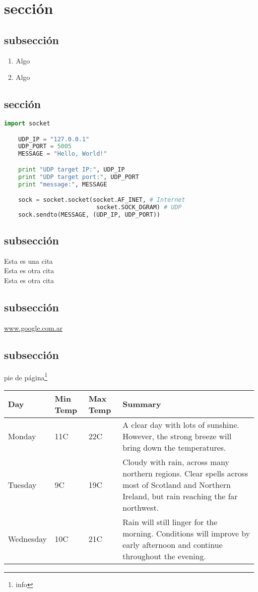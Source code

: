\section{secci\'on}
\subsection{subsecci\'on}
  \begin{enumerate}
    \item Algo
    \item Algo
  \end{enumerate}
\subsection{secci\'on}
  \begin{lstlisting}[language=Python]
    import socket

    UDP_IP = "127.0.0.1"
    UDP_PORT = 5005
    MESSAGE = "Hello, World!"

    print "UDP target IP:", UDP_IP
    print "UDP target port:", UDP_PORT
    print "message:", MESSAGE

    sock = socket.socket(socket.AF_INET, # Internet
                          socket.SOCK_DGRAM) # UDP
    sock.sendto(MESSAGE, (UDP_IP, UDP_PORT))
  \end{lstlisting}
\subsection{subsecci\'on}
  \noindent
  Esta es una cita \cite{einstein}\\
  Esta es otra cita \cite{dirac}\\
  Esta es otra cita \cite{knuthwebsite}\\
\subsection{subsecci\'on}
  \noindent
  \url{www.google.com.ar}
\subsection{subsecci\'on}
pie de p\'agina\footnote{info}
\begin{center}
    \begin{tabular}{ | l | l | l | p{5cm} |}
    \hline
    Day & Min Temp & Max Temp & Summary \\ \hline
    Monday & 11C & 22C & A clear day with lots of sunshine.
    However, the strong breeze will bring down the temperatures. \\ \hline
    Tuesday & 9C & 19C & Cloudy with rain, across many northern regions. Clear spells
    across most of Scotland and Northern Ireland,
    but rain reaching the far northwest. \\ \hline
    Wednesday & 10C & 21C & Rain will still linger for the morning.
    Conditions will improve by early afternoon and continue
    throughout the evening. \\
    \hline
    \end{tabular}
\end{center}

